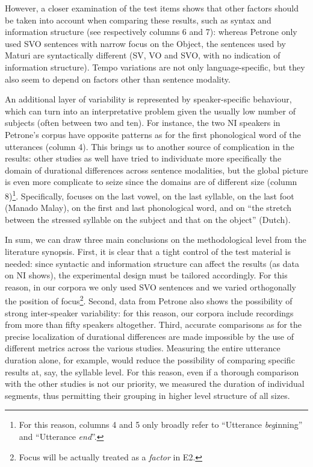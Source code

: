 However, a closer examination of the test items shows that other factors should be taken into account when comparing these results, such as syntax and information structure (see respectively columns 6 and 7): whereas Petrone only used SVO sentences with narrow focus on the Object, the sentences used by Maturi are syntactically different (SV, VO and SVO, with no indication of information structure). Tempo variations are not only language-specific, but they also seem to depend on factors other than sentence modality. 

An additional layer of variability is represented by speaker-specific behaviour, which can turn into an interpretative problem given the usually low number of subjects (often between two and ten). For instance, the two NI speakers in Petrone's corpus have opposite patterns as for the first phonological word of the utterances (column 4). This brings us to another source of complication in the results: other studies as well have tried to individuate more specifically the domain of durational differences across sentence modalities, but the global picture is even more complicate to seize since the domains are of different size (column 8)\footnote{For this reason, columns 4 and 5 only broadly refer to ``Utterance \textit{beg}inning'' and ``Utterance \textit{end}''.}. Specifically, \citet{smith2002prosodic} focuses on the last vowel, \citet{ryalls1994effects} on the last syllable, \citet{vanheuven2005speech} on the last foot (Manado Malay), \citet{petrone2008role} on the first and last phonological word, and \citet{vanheuven2005speech} on ``the stretch between the stressed syllable on the subject and that on the object'' (Dutch). 

In sum, we can draw three main conclusions on the methodological level from the literature synopsis. First, it is clear that a tight control of the test material is needed: since syntactic and information structure can affect the results (as data on NI shows), the experimental design must be tailored accordingly. For this reason, in our corpora we only used SVO sentences and we varied orthogonally the position of focus\footnote{Focus will be actually treated as a \textit{factor} in E2.}. Second, data from Petrone also shows the possibility of strong inter-speaker variability: for this reason, our corpora include recordings from more than fifty speakers altogether. Third, accurate comparisons as for the precise localization of durational differences are made impossible by the use of different metrics across the various studies. Measuring the entire utterance duration alone, for example, would reduce the possibility of comparing specific results at, say, the syllable level. For this reason, even if a thorough comparison with the other studies is not our priority, we measured the duration of individual segments, thus permitting their grouping in higher level structure of all sizes.

